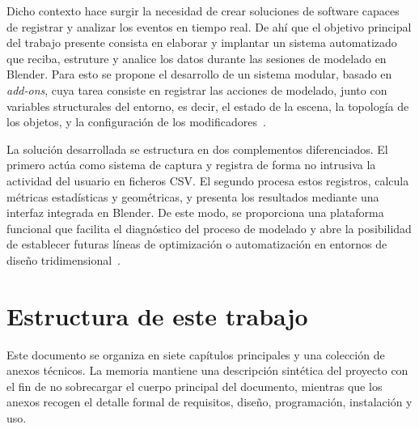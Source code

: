 Dicho contexto hace surgir la necesidad de crear soluciones de software capaces de registrar y analizar los eventos en tiempo real. De ahí que el objetivo principal del trabajo presente consista en elaborar y implantar un sistema automatizado que reciba, estruture y analice los datos durante las sesiones de modelado en Blender. Para esto se propone el desarrollo de un sistema modular, basado en \textit{add-ons}, cuya tarea consiste en registrar las acciones de modelado, junto con variables structurales del entorno, es decir, el estado de la escena, la topología de los objetos, y la configuración de los modificadores~\cite{parnas1972criteria,pressman2005}.

La solución desarrollada se estructura en dos complementos diferenciados. El primero actúa como sistema de captura y registra de forma no intrusiva la actividad del usuario en ficheros CSV. El segundo procesa estos registros, calcula métricas estadísticas y geométricas, y presenta los resultados mediante una interfaz integrada en Blender. De este modo, se proporciona una plataforma funcional que facilita el diagnóstico del proceso de modelado y abre la posibilidad de establecer futuras líneas de optimización o automatización en entornos de diseño tridimensional~\cite{munzner2014visualization}.

\section{Estructura de este trabajo}

Este documento se organiza en siete capítulos principales y una colección de anexos técnicos. La memoria mantiene una descripción sintética del proyecto con el fin de no sobrecargar el cuerpo principal del documento, mientras que los anexos recogen el detalle formal de requisitos, diseño, programación, instalación y uso.

